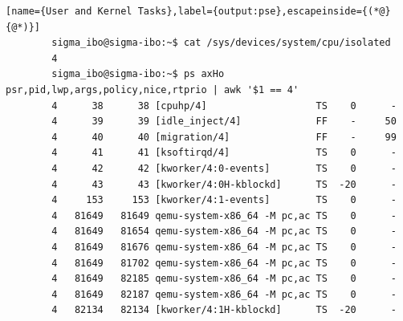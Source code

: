 \documentclass[MMR,Master,english]{twbook}
\begin{document}
\vspace{1em}
\begin{minipage}{0.95\columnwidth}
	\begin{lstlisting}[name={User and Kernel Tasks},label={output:pse},escapeinside={(*@}{@*)}]
		sigma_ibo@sigma-ibo:~$ cat /sys/devices/system/cpu/isolated
		4
		sigma_ibo@sigma-ibo:~$ ps axHo psr,pid,lwp,args,policy,nice,rtprio | awk '$1 == 4'
		4      38      38 [cpuhp/4]                   TS    0      -
		4      39      39 [idle_inject/4]             FF    -     50
		4      40      40 [migration/4]               FF    -     99
		4      41      41 [ksoftirqd/4]               TS    0      -
		4      42      42 [kworker/4:0-events]        TS    0      -
		4      43      43 [kworker/4:0H-kblockd]      TS  -20      -
		4     153     153 [kworker/4:1-events]        TS    0      -
		4   81649   81649 qemu-system-x86_64 -M pc,ac TS    0      -
		4   81649   81654 qemu-system-x86_64 -M pc,ac TS    0      -
		4   81649   81676 qemu-system-x86_64 -M pc,ac TS    0      -
		4   81649   81702 qemu-system-x86_64 -M pc,ac TS    0      -
		4   81649   82185 qemu-system-x86_64 -M pc,ac TS    0      -
		4   81649   82187 qemu-system-x86_64 -M pc,ac TS    0      -
		4   82134   82134 [kworker/4:1H-kblockd]      TS  -20      -
\end{lstlisting}
\end{minipage}
\end{document}
